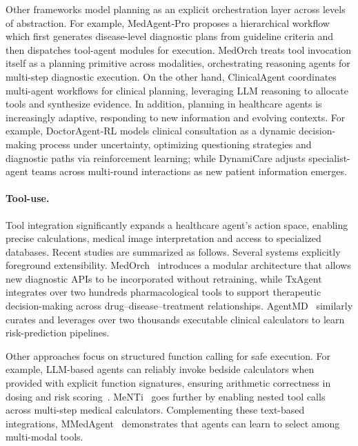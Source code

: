 Other frameworks model planning as an explicit orchestration layer across levels of abstraction. For example, MedAgent‑Pro \cite{wang2025medagent} proposes a hierarchical workflow which first generates disease-level diagnostic plans from guideline criteria and then dispatches tool-agent modules for execution. MedOrch \cite{he2025medorchmedicaldiagnosistoolaugmented} treats tool invocation itself as a planning primitive across modalities, orchestrating reasoning agents for multi-step diagnostic execution. On the other hand, ClinicalAgent \cite{yue2024clinicalagentclinicaltrialmultiagent} coordinates multi-agent workflows for clinical planning, leveraging LLM reasoning to allocate tools and synthesize evidence. In addition, planning in healthcare agents is increasingly adaptive, responding to new information and evolving contexts. For example, DoctorAgent‑RL \cite{feng2025doctoragentrlmultiagentcollaborativereinforcement} models clinical consultation as a dynamic decision-making process under uncertainty, optimizing questioning strategies and diagnostic paths via reinforcement learning; while DynamiCare \cite{shang2025dynamicaredynamicmultiagentframework} adjusts specialist-agent teams across multi-round interactions as new patient information emerges.



\paragraph{Tool-use.}


Tool integration significantly expands a healthcare agent’s action space, enabling precise calculations, medical image interpretation and access to specialized databases. Recent studies are summarized as follows. Several systems explicitly foreground extensibility. MedOrch~\cite{he2025medorchmedicaldiagnosistoolaugmented} introduces a modular architecture that allows new diagnostic APIs to be incorporated without retraining, while TxAgent~\cite{gao2025txagentaiagenttherapeutic} integrates over two hundreds pharmacological tools to support therapeutic decision-making across drug–disease–treatment relationships. AgentMD~\cite{jin2024agentmdempoweringlanguageagents} similarly curates and leverages over two thousands executable clinical calculators to learn risk-prediction pipelines.

Other approaches focus on structured function calling for safe execution. For example, LLM-based agents can reliably invoke bedside calculators when provided with explicit function signatures, ensuring arithmetic correctness in dosing and risk scoring~\cite{Goodell_2025}. MeNTi~\cite{zhu2025mentibridgingmedicalcalculator} goes further by enabling nested tool calls across multi-step medical calculators. Complementing these text-based integrations, MMedAgent~\cite{li2024mmedagent} demonstrates that agents can learn to select among multi-modal tools. 

